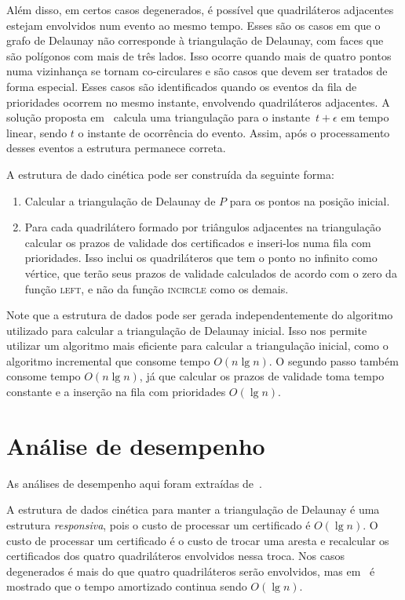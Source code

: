 Além disso, em certos casos degenerados, é possível que quadriláteros adjacentes estejam
envolvidos num evento ao mesmo tempo.
Esses são os casos em que o grafo de Delaunay não corresponde à triangulação de Delaunay, com
faces que são polígonos com mais de três lados.
Isso ocorre quando mais de quatro pontos numa vizinhança se tornam co-circulares e são casos que
devem ser tratados de forma especial.
Esses casos são identificados quando os eventos da fila de prioridades ocorrem no mesmo instante,
envolvendo quadriláteros adjacentes.
A solução proposta em~\cite{aggarwal-guibas-saxe-shor} calcula uma triangulação para o
instante~$t + \epsilon$ em tempo linear, sendo $t$ o instante de ocorrência do evento.
Assim, após o processamento desses eventos a estrutura permanece correta.

A estrutura de dado cinética pode ser construída da seguinte forma:
\begin{enumerate}
    \item Calcular a triangulação de Delaunay de $P$ para os pontos na posição inicial.
    \item Para cada quadrilátero formado por triângulos adjacentes na triangulação calcular os
    prazos de validade dos certificados e inseri-los numa fila com prioridades.
    Isso inclui os quadriláteros que tem o ponto no infinito como vértice, que terão seus prazos
    de validade calculados de acordo com o zero da função \textsc{left}, e não da função
    \textsc{incircle} como os demais.
\end{enumerate}

Note que a estrutura de dados pode ser gerada independentemente do algoritmo utilizado para
calcular a triangulação de Delaunay inicial.
Isso nos permite utilizar um algoritmo mais eficiente para calcular a triangulação inicial, como o
algoritmo incremental que consome tempo $O(n\lg{n})$.
O segundo passo também consome tempo $O(n\lg{n})$, já que calcular os prazos de validade toma
tempo constante e a inserção na fila com prioridades $O(\lg{n})$.


\section{Análise de desempenho}\label{sec:delaunay:analise-de-desempenho}

As análises de desempenho aqui foram extraídas de~\cite{eduardo}.

A estrutura de dados cinética para manter a triangulação de Delaunay é uma estrutura
\textit{responsiva}, pois o custo de processar um certificado é $O(\lg{n})$.
O custo de processar um certificado é o custo de trocar uma aresta e recalcular os certificados dos
quatro quadriláteros envolvidos nessa troca.
Nos casos degenerados é mais do que quatro quadriláteros serão envolvidos, mas
em~\cite{guibas-mitchell-roos} é mostrado que o tempo amortizado continua sendo $O(\lg{n})$.

